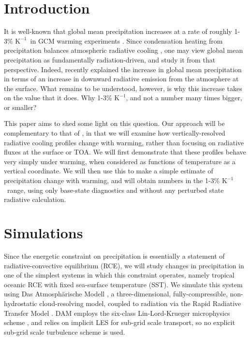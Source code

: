 \documentclass[10pt]{article}
\newcommand{\Kinverse}{\ensuremath{\mathrm{K^{-1}}}}
\begin{document}
\section {Introduction}
It is well-known that global mean precipitation  increases at a rate of roughly 1-3\% \Kinverse\  in GCM warming experiments \citep{stephens2008,lambert2008,held2006}. Since condensation heating from precipitation balances atmospheric radiative cooling \citep{ogorman2012,allen2002}, one may view global mean precipitation as  fundamentally radiation-driven, and study it from that perspective. Indeed, \cite{pendergrass2014} recently explained the increase in global mean precipitation in terms of an increase in downward radiative emission from the atmosphere at the surface.  What remains to be understood, however, is why this increase takes on the value that it does. Why 1-3\% \Kinverse, and not a number many times bigger, or smaller?

This paper aims  to shed some light on this question. Our approach will be complementary to that of \cite{pendergrass2014}, in that we will examine how vertically-resolved radiative cooling profiles change with warming, rather than focusing on radiative fluxes at the surface or TOA. We will first  demonstrate that these profiles behave very simply under warming, when considered as functions of temperature as a vertical coordinate. We will then use this  to make a simple estimate of precipitation change with warming, and will obtain numbers in the 1-3\% \Kinverse\ range, using only base-state diagnostics and without any perturbed state radiative calculation.

\section{Simulations}
Since the energetic constraint on precipitation is essentially a statement of radiative-convective equilibrium (RCE), we will study changes in precipitation in one of the simplest systems in which this constraint operates, namely tropical oceanic RCE  with fixed sea-surface temperature (SST). We simulate this system using Das Atmosph\"arische Modell \citep[DAM,][]{romps2008},   a three-dimensional, fully-compressible, non-hydrostatic cloud-resolving model, coupled to radiation via the Rapid Radiative Transfer Model 
\citep[RRTM,][]{mlawer1997}. DAM employs the six-class Lin-Lord-Krueger  microphysics scheme \citep{lin1983, lord1984, krueger1995}, and relies on implicit LES \citep{margolin2006} for sub-grid scale transport, so no explicit sub-grid scale turbulence scheme is used.
	
\end{document}
